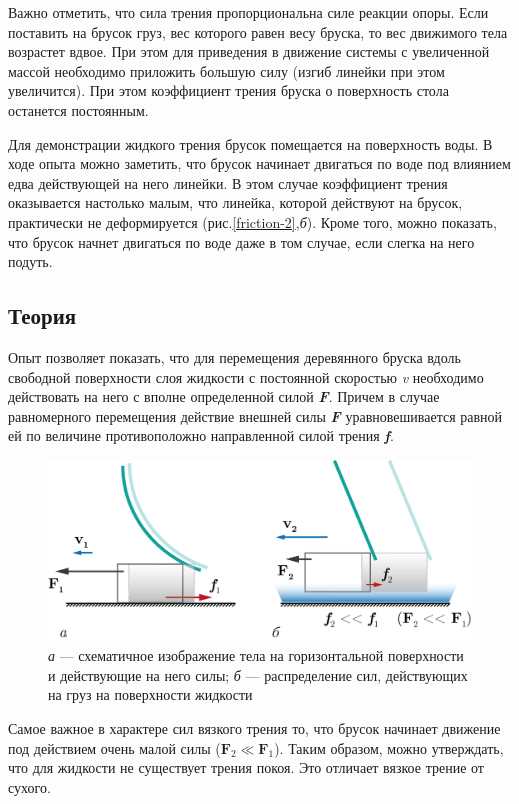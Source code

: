 \documentclass[All.tex]{subfiles}
\begin{document}
	Важно отметить, что сила трения пропорциональна силе реакции опоры.
	Если поставить на брусок груз, вес которого равен весу бруска, то вес движимого тела возрастет вдвое.
	При этом для приведения в движение системы с увеличенной массой необходимо приложить большую силу (изгиб линейки при этом увеличится).
	При этом коэффициент трения бруска о поверхность стола останется постоянным.
	


	Для демонстрации жидкого трения брусок помещается на поверхность воды.
	В ходе опыта можно заметить, что брусок начинает двигаться по воде под влиянием едва действующей на него линейки.
	В этом случае коэффициент трения оказывается настолько малым, что линейка, 
	которой действуют на брусок, практически не деформируется (рис.\ref{friction-2},\textit{б}).
	Кроме того, можно показать, что брусок начнет двигаться по воде даже в том случае, 
	если слегка на него подуть.
		
\subsection*{\textcolor{PineGreen}{Теория}}

Опыт позволяет показать, что для перемещения деревянного бруска вдоль свободной поверхности слоя жидкости с постоянной скоростью \textit{v} необходимо действовать на него с вполне определенной силой \textit{\textbf{F}}.
Причем в случае равномерного перемещения действие внешней силы \textit{\textbf{F}} уравновешивается равной ей по величине противоположно направленной силой трения \textit{\textbf{f}}.

	\begin{figure}[H] 
	\centering 	
	\includegraphics[width=0.75\linewidth]{friction-3.png}
	\caption{\textit{а} — схематичное изображение тела на горизонтальной поверхности и действующие на него силы; \textit{б} — распределение сил, действующих на груз на поверхности жидкости}
	\label{friction-3}
\end{figure}

Самое важное в характере сил вязкого трения то, что брусок начинает движение под действием очень малой силы ($ \textbf{F}_2 \ll \textbf{F}_1 $).
Таким образом, можно утверждать, что для жидкости не существует трения покоя. 
Это отличает вязкое трение от сухого.
	
\end{document}
